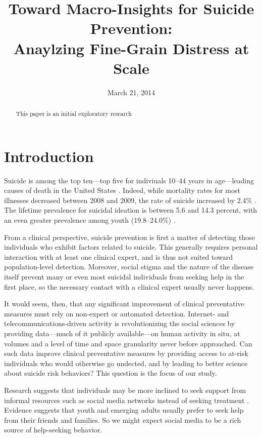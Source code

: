 \documentclass[11pt]{article}
\title{Toward Macro-Insights  for Suicide Prevention: \\ Anaylzing Fine-Grain Distress at Scale}
\date{March 21, 2014}
\begin{document}
\maketitle
\begin{abstract}

This paper is an initial exploratory research 
 \end{abstract}

\section{Introduction}


Suicide is among the top ten---top five for indiviuals 10--44 years in age---leading causes of death in the United States \cite{heron2009deaths}. Indeed, while mortality rates for most illnesses decreased between 2008 and 2009, the rate of suicide increased by 2.4\%  \cite{heron2009deaths}. The lifetime prevalence for suicidal ideation is between 5.6 and 14.3 percent, with an even greater prevalence among youth (19.8–24.0\%) \cite{nock2008suicide}. 

From a clinical perspective, suicide prevention is first a matter of detecting those individuals who exhibit factors related to suicide. This generally requires personal interaction with at least one clinical expert, and is thus not suited toward population-level detection. Moreover, social stigma and the nature of the disease itself prevent many or even most suicidal individuals from seeking help in the first place, so the necessary contact with a clinical expert usually never happens. 

It would seem, then, that any significant improvement of clinical preventative measures must rely on non-expert or automated detection. 
Internet- and telecommunications-driven activity is revolutionizing the social sciences by providing data---much of it publicly available---on human activity in situ, at volumes and a level of time and space granularity never before approached. Can such data improve clinical preventative measures by providing access to at-risk individuals who would otherwise go undected, and by leading to better science about suicide risk behaviors? This question is the focus of our study.





Research suggests that individuals may be more inclined to seek support from informal resources such as social media networks instead of seeking treatment \cite{crosby2011self,bruffaerts2011treatment,ryan2010universal}. Evidence suggests that youth and emerging adults usually prefer to seek help from their friends and families. So we might expect social media to be a rich source of help-seeking behavior. 
\end{document}
